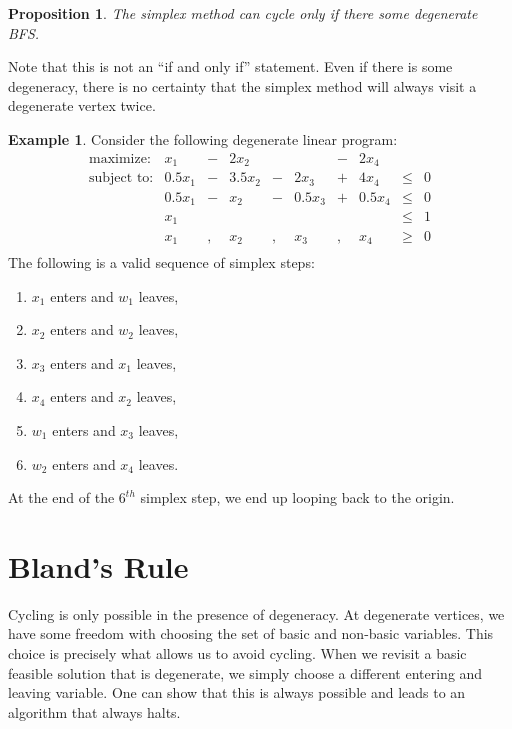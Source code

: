 \documentclass[
]{book}
\providecommand{\tightlist}{%
  \setlength{\itemsep}{0pt}\setlength{\parskip}{0pt}}
\newtheorem{proposition}{Proposition}[chapter]
\theoremstyle{definition}
\theoremstyle{definition}
\newtheorem{example}{Example}[chapter]
\theoremstyle{definition}
\theoremstyle{definition}
\theoremstyle{remark}
\begin{document}
\begin{proposition}
The simplex method can cycle only if there some degenerate BFS.
\end{proposition}

Note that this is not an ``if and only if'' statement. Even if there is some degeneracy, there is no
certainty that the simplex method will always visit a degenerate vertex twice.

\begin{example}
\protect\hypertarget{exm:cycling}{}\label{exm:cycling}Consider the following degenerate linear program: \begin{equation*}
\begin{array}{rrrrrrrrrl} \mbox{maximize:} & x_1 & - & 2x_2 & & & - & 2x_4 \\
  \mbox{subject to:} & 0.5 x_1 & - & 3.5x_2 & - & 2x_3 & + & 4 x_4 & \le & 0 \\
    & 0.5 x_1 & - & x_2 & - & 0.5 x_3 & + & 0.5 x_4 & \le & 0 \\
    & x_1 & & & & &  &  & \le & 1 \\
    & x_1 & , & x_2 & , & x_3 & , & x_4 & \ge & 0 \\
  \end{array} \end{equation*} The following is a valid sequence of simplex steps:

\begin{enumerate}
\def\labelenumi{\arabic{enumi}.}
\tightlist
\item
  \(x_1\) enters and \(w_1\) leaves,
\item
  \(x_2\) enters and \(w_2\) leaves,
\item
  \(x_3\) enters and \(x_1\) leaves,
\item
  \(x_4\) enters and \(x_2\) leaves,
\item
  \(w_1\) enters and \(x_3\) leaves,
\item
  \(w_2\) enters and \(x_4\) leaves.
\end{enumerate}

At the end of the \(6^{th}\) simplex step, we end up looping back to the origin.
\end{example}

\hypertarget{blands-rule}{%
\section{Bland's Rule}\label{blands-rule}}

Cycling is only possible in the presence of degeneracy. At degenerate vertices, we have some freedom
with choosing the set of basic and non-basic variables. This choice is precisely what allows us to
avoid cycling. When we revisit a basic feasible solution that is degenerate, we simply choose a
different entering and leaving variable. One can show that this is always possible and leads to an
algorithm that always halts.
\end{document}
